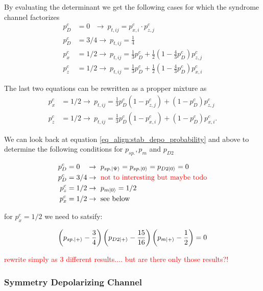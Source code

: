 By evaluating the determinant we get the following cases for which the syndrome channel factorizes
\begin{align}
    p_D^c &= 0 \ \ \ \rightarrow  \  p_{t,ij} =  p_{x,i}^c \cdot p_{z,j}^c\\
    p_D^c &= 3/4 \rightarrow\   p_{t,ij} = \frac{1}{4} \\
    p_x^c &= 1/2 \rightarrow \  p_{t,ij} =  \frac{1}{3}p_D^c + \frac{1}{2}\left(1-\frac{4}{3}p_D^c\right)p_{z,j}^c\\
    p_z^c &= 1/2 \rightarrow \  p_{t,ij} =  \frac{1}{3}p_D^c + \frac{1}{2}\left(1-\frac{4}{3}p_D^c\right)p_{x,i}^c
\end{align}

The last two equations can be rewritten as a propper mixture as 
\begin{align*}
    p_x^c &= 1/2 \rightarrow \  p_{t,ij} =  \frac{1}{3}p_D^c (1-p_{z,j}^c) + (1-p_D^c) p_{z,j}^c \\
    p_z^c &= 1/2 \rightarrow \  p_{t,ij} =  \frac{1}{3}p_D^c (1-p_{x,i}^c) + (1-p_D^c) p_{x,i}^c.
\end{align*}

We can look back at equation \ref{eq_align:stab_depo_probability} and above to determine the following conditions for $p_{sp.},p_{m}$ and $p_{D2}$

\begin{align}
    p_D^c &= 0 \ \ \ \rightarrow  \ p_{sp.\ket{\Psi}} =  p_{sp.\ket{0}} = p_{D2\ket{0}} = 0   \\
    p_D^c &= 3/4 \rightarrow\  \text{\textcolor{red}{not to interesting but maybe todo}} \\
    p_z^c &= 1/2 \rightarrow \ p_{m\ket{0}} = 1/2 \\
    p_x^c &= 1/2 \rightarrow \ \text{see below} 
\end{align}

for $p_x^c=1/2$ we need to satsify:

\begin{equation}
    \left(p_{sp.\ket{+}}- \frac{3}{4}\right)
    \left(p_{D2\ket{+}}-\frac{15}{16}\right)
    \left(p_{m\ket{+}}-\frac{1}{2}\right) = 0
\end{equation}

\textcolor{red}{rewrite simply as 3 different results.... but are there only those results?!}

\subsubsection{Symmetry Depolarizing Channel}

